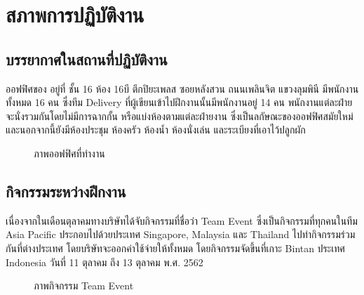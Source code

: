 \chapter{สภาพการปฏิบัติงาน}

\section{บรรยากาศในสถานที่ปฏิบัติงาน}

ออฟฟิศของ \Company อยู่ที่ ชั้น 16 ห้อง 16บี ตึกปิยะเพลส ซอยหลังสวน ถนนเพลินจิต แขวงลุมพินี มีพนักงานทั้งหมด 16 คน ซึ่งทีม Delivery ที่ผู้เขียนเข้าไปฝึกงานนั้นมีพนักงานอยู่ 14 คน พนักงานแต่ละฝ่ายจะนั่งรวมกันโดยไม่มีการฉากกั้น หรือแบ่งห้องตามแต่ละฝ่ายงาน ซึ่งเป็นลกัษณะของออฟฟิศสมัยใหม่ และนอกจากนี้ยังมีห้องประชุม ห้องครัว ห้องน้ำ ห้องนั่งเล่น และระเบียงที่เอาไว้ปลูกผัก

\begin{figure}[!h]
    \centering
    \caption{ภาพออฟฟิศที่ทำงาน}
    \label{Fig:office}
\end{figure}

\section{กิจกรรมระหว่างฝึกงาน}

เนื่องจากในเดือนตุลาคมทางบริษัทได้จับกิจกรรมที่ชื่อว่า Team Event ซึ่งเป็นกิจกรรมที่ทุกคนในทีม Asia Pacific ประกอบไปด้วยประเทศ Singapore, Malaysia และ Thailand ไปทำกิจกรรมร่วมกันที่ต่างประเทศ โดยบริษัทจะออกค่าใช้จ่ายให้ทั้งหมด โดยกิจกรรมจัดขึ้นที่เกาะ Bintan ประเทศ Indonesia วันที่ 11 ตุลาคม ถึง 13 ตุลาคม พ.ศ. 2562

\begin{figure}[!h]
	\centering
	\caption{ภาพกิจกรรม Team Event}
	\label{Fig:teamevent}
\end{figure}

